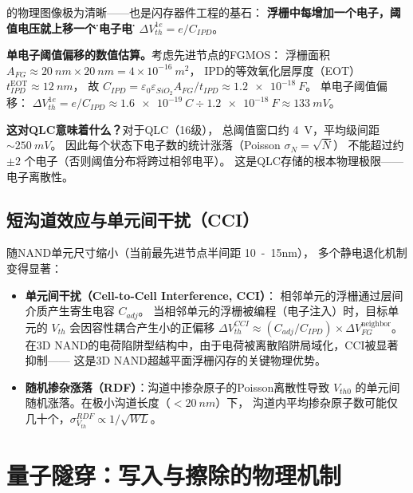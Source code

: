 \documentclass[11pt,a4paper,twoside]{article}
\theoremstyle{definition}
\theoremstyle{plain}
\theoremstyle{remark}
\begin{document}
的物理图像极为清晰——也是闪存器件工程的基石：
\textbf{浮栅中每增加一个电子，阈值电压就上移一个\"单电子电压\"}
$\Delta V_{th}^{1e} = e / C_{IPD}$。

\begin{physbox}
  \textbf{单电子阈值偏移的数值估算。}考虑先进节点的FGMOS：
  浮栅面积 $A_{FG} \approx \SI{20}{nm} \times \SI{20}{nm}
  = 4 \times 10^{-16}\ \si{m^2}$，
  IPD的等效氧化层厚度（EOT）$t_{IPD}^{\text{EOT}} \approx \SI{12}{nm}$，
  故 $C_{IPD} = \varepsilon_0 \varepsilon_{SiO_2} A_{FG} / t_{IPD}
  \approx \SI{1.2e-18}{F}$。
  单电子阈值偏移：
  $\Delta V_{th}^{1e} = e / C_{IPD} \approx \SI{1.6e-19}{C} \div \SI{1.2e-18}{F}
  \approx \SI{133}{mV}$。

  \textbf{这对QLC意味着什么？}对于QLC（16级），
  总阈值窗口约 \SI{4}{V}，平均级间距 $\sim \SI{250}{mV}$。
  因此每个状态下电子数的统计涨落（Poisson $\sigma_N = \sqrt{\bar{N}}$）
  不能超过约 $\pm 2$ 个电子（否则阈值分布将跨过相邻电平）。
  这是QLC存储的根本物理极限——电子离散性。
\end{physbox}

\subsection{短沟道效应与单元间干扰（CCI）}

随NAND单元尺寸缩小（当前最先进节点半间距 \SI{10}{-15}{nm}），
多个静电退化机制变得显著：

\begin{itemize}
  \item \textbf{单元间干扰（Cell-to-Cell Interference, CCI）}：
  相邻单元的浮栅通过层间介质产生寄生电容 $C_{adj}$。
  当相邻单元的浮栅被编程（电子注入）时，目标单元的 $V_{th}$ 会因容性耦合产生小的正偏移
  $\Delta V_{th}^{CCI} \approx (C_{adj} / C_{IPD}) \times \Delta V_{FG}^{\text{neighbor}}$。
  在3D NAND的电荷陷阱型结构中，由于电荷被离散陷阱局域化，CCI被显著抑制——
  这是3D NAND超越平面浮栅闪存的关键物理优势。
  \item \textbf{随机掺杂涨落（RDF）}：沟道中掺杂原子的Poisson离散性导致
  $V_{th0}$ 的单元间随机涨落。在极小沟道长度（$<\SI{20}{nm}$）下，
  沟道内平均掺杂原子数可能仅几十个，$\sigma_{V_{th}}^{RDF} \propto 1/\sqrt{WL}$。
\end{itemize}

\section{量子隧穿：写入与擦除的物理机制}
\label{sec:tunneling}
\end{document}
